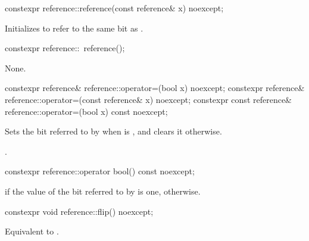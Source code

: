 %
\begin{itemdecl}
constexpr reference::reference(const reference& x) noexcept;
\end{itemdecl}

\begin{itemdescr}
\pnum
\effects
Initializes  to refer to the same bit as .
\end{itemdescr}

%
\begin{itemdecl}
constexpr reference::~reference();
\end{itemdecl}

\begin{itemdescr}
\pnum
\effects
None.
\end{itemdescr}

%
\begin{itemdecl}
constexpr reference& reference::operator=(bool x) noexcept;
constexpr reference& reference::operator=(const reference& x) noexcept;
constexpr const reference& reference::operator=(bool x) const noexcept;
\end{itemdecl}

\begin{itemdescr}
\pnum
\effects
Sets the bit referred to by  when  is ,
and clears it otherwise.

\pnum
\returns
{}.
\end{itemdescr}

%
\begin{itemdecl}
constexpr reference::operator bool() const noexcept;
\end{itemdecl}

\begin{itemdescr}
\pnum
\returns
{} if the value of the bit referred to by  is one,
 otherwise.
\end{itemdescr}

%
\begin{itemdecl}
constexpr void reference::flip() noexcept;
\end{itemdecl}

\begin{itemdescr}
\pnum
\effects
Equivalent to .
\end{itemdescr}

